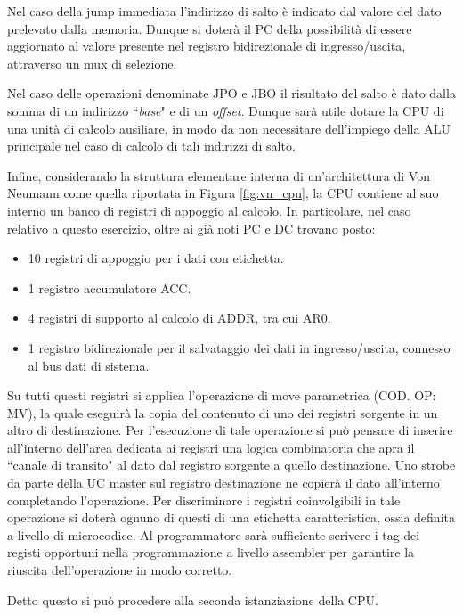 \par \bigskip \noindent
Nel caso della jump immediata l'indirizzo di salto è indicato dal valore del dato prelevato dalla memoria. Dunque si doterà il PC della possibilità di essere aggiornato al valore presente nel registro bidirezionale di ingresso/uscita, attraverso un mux di selezione.
\par \bigskip \noindent
Nel caso delle operazioni denominate JPO e JBO il risultato del salto è dato dalla somma di un indirizzo \textquotedblleft \textit{base}" e di un \textit{offset}. Dunque sarà utile dotare la CPU di una unità di calcolo ausiliare, in modo da non necessitare dell'impiego della ALU principale nel caso di calcolo di tali indirizzi di salto.
\par \bigskip \noindent
Infine, considerando la struttura elementare interna di un'architettura di Von Neumann come quella riportata in Figura \ref{fig:vn_cpu}, la CPU contiene al suo interno un banco di registri di appoggio al calcolo. In particolare, nel caso relativo a questo esercizio, oltre ai già noti PC e DC trovano posto:
\begin{itemize}
	\item 10 registri di appoggio per i dati con etichetta.
	\item 1 registro accumulatore ACC.
	\item 4 registri di supporto al calcolo di ADDR, tra cui AR0.
	\item 1 registro bidirezionale per il salvataggio dei dati in ingresso/uscita, connesso al bus dati di sistema.
\end{itemize}
Su tutti questi registri si applica l'operazione di move parametrica (COD. OP: MV), la quale eseguirà la copia del contenuto di uno dei registri sorgente in un altro di destinazione. Per l'esecuzione di tale operazione si può pensare di inserire all'interno dell'area dedicata ai registri una logica combinatoria che apra il \textquotedblleft canale di transito" al dato dal registro sorgente a quello destinazione. Uno strobe da parte della UC master sul registro destinazione ne copierà il dato all'interno completando l'operazione. Per discriminare i registri coinvolgibili in tale operazione si doterà ognuno di questi di una etichetta caratteristica, ossia definita a livello di microcodice. Al programmatore sarà sufficiente scrivere i tag dei registi opportuni nella programmazione a livello assembler per garantire la riuscita dell'operazione in modo corretto.
\par \bigskip \noindent
Detto questo si può procedere alla seconda istanziazione della CPU.